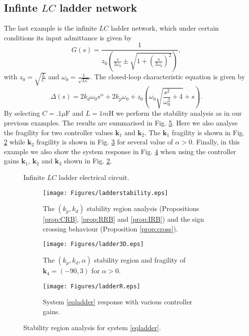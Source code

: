 \documentclass[twoside,reqno,11pt]{fcaa-var} %
\begin{document}
\subsection{Infinte $LC$ ladder network}
The last example is the infinite $LC$ ladder network, which under certain conditions its input admittance is given by \cite{Kelly2009,Klimo_2016}
\begin{equation}
G(s)=\frac{1}{z_0\left(\frac{s}{2\omega_0}\pm\sqrt{1+\left(\frac{s}{2\omega_0}\right)^2}\right)}, \label{eqladder}
\end{equation}
with $z_0=\sqrt{\frac{L}{C}}$ and $\omega_0=\frac{1}{\sqrt{LC}}$. The closed-loop characteristic equation is given by
\begin{equation}
\Delta(s)=2k_d\omega_0 s^{\alpha}+2k_p\omega_0+z_0 \left(\omega_0 \sqrt{\frac{s^2}{\omega_0^2}+4}+s\right).
\end{equation}
By selecting $C=.1\mu\text{F}$ and $L=1m\text{H}$ we perform the stability analysis as in our previous examples. The results are summarised in Fig. \ref{ladderstability}. Here we also analyse the fragility for two controller values $\mathbf{k}_1$ and $\mathbf{k}_2$. The $\mathbf{k}_1$ fragility is shown in Fig. \ref{laddera} while $\mathbf{k}_2$ fragility is shown in Fig. \ref{ladderc} for several value of $\alpha>0$.  Finally, in this example we also show the system response in Fig. \ref{ladderb} when using the controller gains $\mathbf{k}_1$, $\mathbf{k}_2$ and $\mathbf{k}_3$ shown in Fig. \ref{laddera}.
\begin{figure}
	\centering
	\begin{adjustbox}{max width=\columnwidth}
    
	\end{adjustbox}
	\caption{Infinite $LC$ ladder electrical circuit.} \label{infladder}
\end{figure}
\begin{figure}%
	\centering %
	\begin{subfigure}[b]{0.48\columnwidth}
		\centering
		\texttt{[image: Figures/ladderstability.eps]}
		\caption{The $(k_p,k_d)$ stability region analysis (Propositions \ref{prop:CRB}, \ref{prop:RRB} and \ref{prop:IRB}) and  the sign crossing behaviour (Proposition \ref{prop:cross}).}
		\label{laddera}
	\end{subfigure}
	\hfill
\begin{subfigure}[b]{0.48\columnwidth}
	\centering
	\texttt{[image: Figures/ladder3D.eps]}
	\caption{The $(k_p,k_d,\alpha)$ stability region and fragility of $\mathbf{k}_4=(-90,3)$ for $\alpha>0$. }
	\label{ladderc}
\end{subfigure}
	\hfill
	\begin{subfigure}[b]{0.48\columnwidth}
		\centering
		\texttt{[image: Figures/ladderR.eps]}
		\caption{System \eqref{eqladder} response with various controller gains.}
		\label{ladderb}
	\end{subfigure}
	\caption{Stability region analysis for system \eqref{eqladder}.}\label{ladderstability}
\end{figure}
\end{document}
